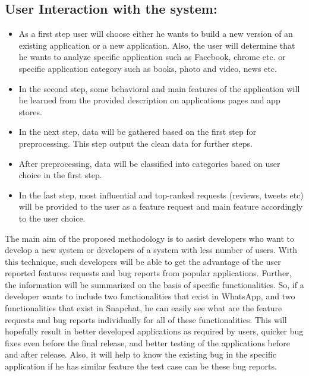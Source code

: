 \subsection{User Interaction with the system:}
\begin{itemize}

\item{As a first step user will choose either he wants to build a new version of an existing application or a new application. Also, the user will determine that he wants to analyze specific application such as Facebook, chrome etc. 
or specific application category such as books, photo and video, news etc.}
\item{In the second step, some behavioral and main features of the application will be learned from the provided description on applications pages and app stores.}
\item{In the next step, data will be gathered based on the first step for preprocessing. This step output the clean data for further steps.}
\item{After preprocessing, data will be classified into categories based on user choice in the first step.}
\item{In the last step, most influential and top-ranked requests (reviews, tweets etc) will be provided to the user as a feature request and main feature accordingly to the user choice.}

\end{itemize}

	The main aim of the proposed methodology is to assist developers who want to develop a new
system or developers of a system with less number of users. With this technique, such
developers will be able to get the advantage of the user reported features requests and bug reports
from popular applications. Further, the information will be summarized on the basis of specific
functionalities. So, if a developer wants to include two functionalities that exist in WhatsApp,
and two functionalities that exist in Snapchat, he can easily see what are the feature requests
and bug reports individually for all of these functionalities. This will hopefully result in better
developed applications as required by users, quicker bug fixes even before the final release, and
better testing of the applications before and after release. Also, it will help to know the existing
bug in the specific application if he has similar feature the test case can be these bug reports.